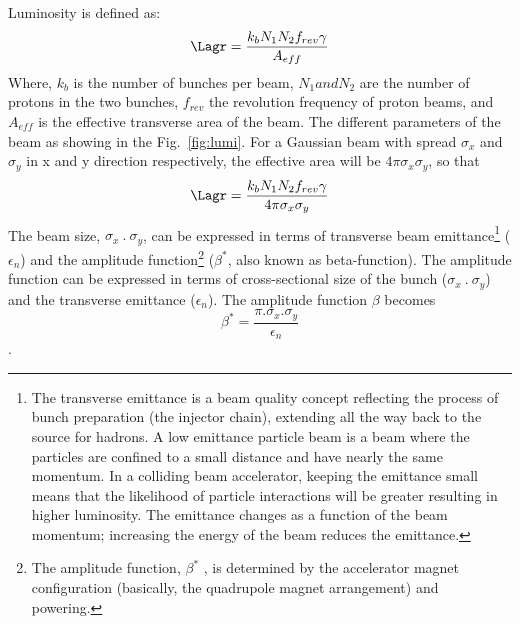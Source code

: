 Luminosity is defined as:
\begin{equation}
    \Lagr = \frac{k_bN_1N_2f_{rev}\gamma}{A_{eff}}
\end{equation}
Where, $k_b$ is the number of bunches per beam, $N_1 and N_2$ are the number of protons in the two bunches, $f_{rev}$ the revolution frequency of proton beams, and $A_{eff}$ is the effective transverse area of the beam. The different parameters of the beam as showing in the Fig.~\ref{fig:lumi}.
For a Gaussian beam with spread $\sigma_x$ and $\sigma_y$ in x and y direction respectively, the effective area will be $4\pi \sigma_x \sigma_y$, so that
\begin{equation}\label{eq:luminosity}
    \Lagr = \frac{k_bN_1N_2f_{rev}\gamma}{4 \pi \sigma_x \sigma_y}
\end{equation}
The beam size, $\sigma_x~.~\sigma_y$, can be expressed in terms of transverse beam emittance\footnote{The transverse emittance is a beam quality concept reflecting the process of bunch preparation (the injector chain), extending all the way back to the source for hadrons. A low emittance particle beam is a beam where the particles are confined to a small distance and have nearly the same momentum. In a colliding beam accelerator, keeping the emittance small means that the likelihood of particle interactions will be greater resulting in higher luminosity. The emittance changes as a function of the beam momentum; increasing the energy of the beam reduces the emittance.} ($\epsilon_n$) and the amplitude function\footnote{The amplitude function, $\beta^*$ , is determined by the accelerator magnet configuration (basically, the quadrupole magnet arrangement) and powering. } ($\beta^*$, also known as beta-function). The amplitude function can be expressed in terms of cross-sectional size of the bunch ($\sigma_x~.~\sigma_y$) and  the transverse emittance ($\epsilon_n$). The amplitude function $\beta$  becomes 
\begin{equation}\label{eq:beta_function}
	\beta^* = \frac{\pi.\sigma_x.\sigma_y}{\epsilon_n}
\end{equation}. 
